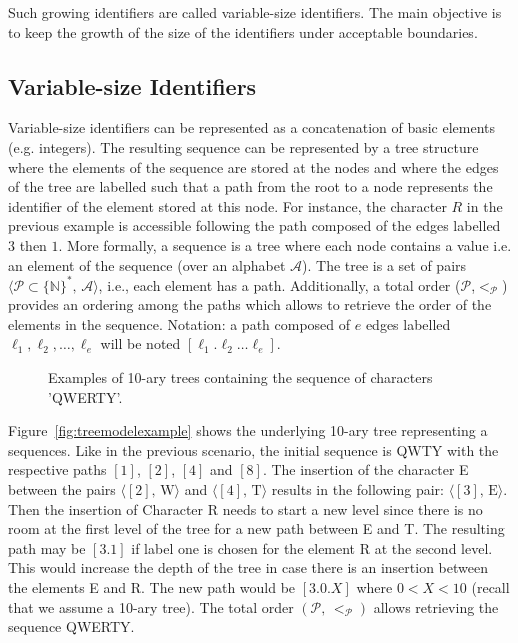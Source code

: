 Such growing identifiers are called variable-size identifiers. The main
objective is to keep the growth of the size of the identifiers under acceptable
boundaries.

\subsection{Variable-size Identifiers}
\label{subsec:variable}

Variable-size identifiers can be represented as a concatenation of basic
elements (e.g. integers). The resulting sequence can be represented by a tree
structure where the elements of the sequence are stored at the nodes and where
the edges of the tree are labelled such that a path from the root to a node
represents the identifier of the element stored at this node. For instance, the
character $R$ in the previous example is accessible following the path composed
of the edges labelled $3$ then $1$. More formally, a sequence is a tree where
each node contains a value i.e. an element of the sequence (over an alphabet
$\mathcal{A}$). The tree is a set of pairs
$\langle\mathcal{P}\subset\{\mathbb{N}\}^*,\, \mathcal{A} \rangle$, i.e., each
element has a path. Additionally, a total order
($\mathcal{P}$,$<_{\mathcal{P}}$) provides an ordering among the paths which
allows to retrieve the order of the elements in the sequence. Notation: a path
composed of $e$ edges labelled $\ell_1,\ell_2,\ldots,\ell_e$ will be noted
$[\ell_1.\ell_2\ldots\ell_e]$.

\begin{figure*}
  \centering
  \hspace{20pt}
  \caption{Examples of 10-ary trees containing the sequence of characters
    'QWERTY'.}
\end{figure*}


Figure~\ref{fig:treemodelexample} shows the underlying 10-ary tree representing
a sequences. Like in the previous scenario, the initial sequence is QWTY with
the respective paths $[1]$, $[2]$, $[4]$ and $[8]$. The insertion of the
character E between the pairs $\langle [2],\, \text{W}\rangle$ and
$\langle [4],\, \text{T}\rangle$ results in the following pair:
$\langle [3],\, \text{E} \rangle$. Then the insertion of Character R needs to
start a new level since there is no room at the first level of the tree for a
new path between E and T. The resulting path may be $[3.1]$ if label one is
chosen for the element R at the second level. This would increase the depth of
the tree in case there is an insertion between the elements E and R. The new
path would be $[3.0.X]$ where $0<X<10$ (recall that we assume a 10-ary
tree). The total order $(\mathcal{P},\,<_\mathcal{P})$ allows retrieving the
sequence QWERTY.

